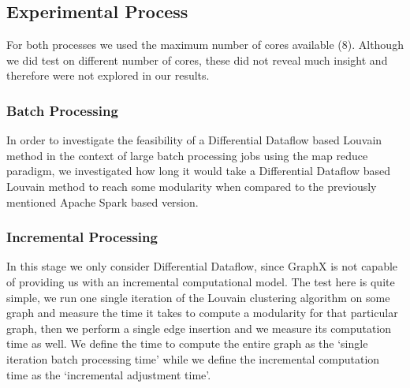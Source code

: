\subsection{Experimental Process}
For both processes we used the maximum number of cores available (8). Although we did test on different number of cores, these did not reveal much insight and therefore were not explored in our results. 
\subsubsection{Batch Processing}
In order to investigate the feasibility of a Differential Dataflow based Louvain method in the context of large batch processing jobs using the map reduce paradigm, we investigated how long it would take a Differential Dataflow based Louvain method to reach some modularity when compared to the previously mentioned Apache Spark based version. 

\subsubsection{Incremental Processing}
In this stage we only consider Differential Dataflow, since GraphX is not capable of providing us with an incremental computational model. The test here is quite simple, we run one single iteration of the Louvain clustering algorithm on some graph and measure the time it takes to compute a modularity for that particular graph, then we perform a single edge insertion and we measure its computation time as well. We define the time to compute the entire graph as the `single iteration batch processing time' while we define the incremental computation time as the `incremental adjustment time'.
